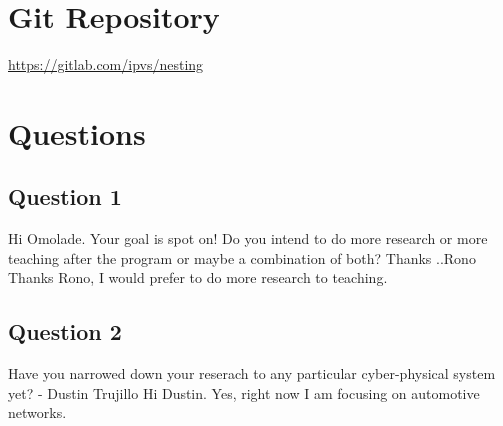 \section{Git Repository}

\url{https://gitlab.com/ipvs/nesting}
\section{Questions}
\subsection{Question 1}

Hi Omolade. Your goal is spot on! Do you intend to do more research or more teaching after the program or maybe a combination of both? Thanks ..Rono
Thanks Rono, I would prefer to do more research to teaching.

\subsection{Question 2}
Have you narrowed down your reserach to any particular cyber-physical system yet? - Dustin Trujillo
Hi Dustin. Yes, right now I am focusing on automotive networks.
